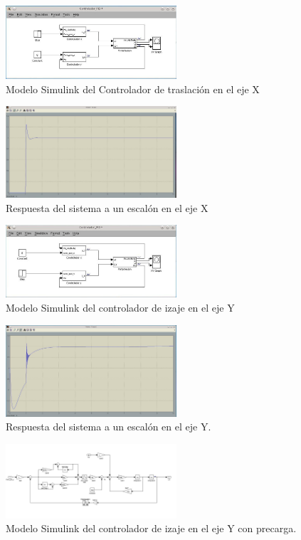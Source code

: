 \documentclass[journal]{IEEEtran}
\begin{document}
\begin{figure}[!t]
 \centering
  \includegraphics[width=2.5in]{Test_x.jpeg}
  \caption{Modelo Simulink del Controlador de traslación en el eje X}
  \label{fig:testx}
\end{figure}

\begin{figure}[!t]
 \centering
  \includegraphics[width=2.5in]{Test_x_posicion.jpeg}
  \caption{Respuesta del sistema a un escalón en el eje X}
  \label{fig:resx}
\end{figure}


\begin{figure}[!t]
 \centering
  \includegraphics[width=2.5in]{Test_y.jpeg}
  \caption{Modelo Simulink del controlador de izaje en el eje Y}
  \label{fig:testy}
\end{figure}

\begin{figure}[!t]
 \centering
  \includegraphics[width=2.5in]{Test_y_posicion.jpeg}
  \caption{Respuesta del sistema a un escalón en el eje Y.}
  \label{fig:resy}
\end{figure}

\begin{figure}[!t]
 \centering
  \includegraphics[width=2.5in]{Controlador_precarga.jpeg}
  \caption{Modelo Simulink del controlador de izaje en el eje Y con precarga.}
  \label{fig:testyComp}
\end{figure}
\end{document}

